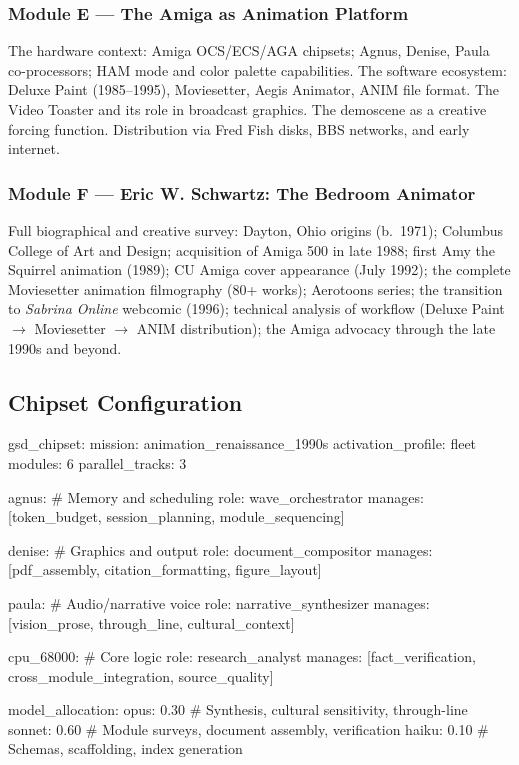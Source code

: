 \documentclass[11pt,letterpaper]{article}
\begin{document}
\subsubsection{Module E --- The Amiga as Animation Platform}
The hardware context: Amiga OCS/ECS/AGA chipsets; Agnus, Denise, Paula co-processors; HAM mode and color palette capabilities. The software ecosystem: Deluxe Paint (1985–1995), Moviesetter, Aegis Animator, ANIM file format. The Video Toaster and its role in broadcast graphics. The demoscene as a creative forcing function. Distribution via Fred Fish disks, BBS networks, and early internet.

\subsubsection{Module F --- Eric W. Schwartz: The Bedroom Animator}
Full biographical and creative survey: Dayton, Ohio origins (b.\ 1971); Columbus College of Art and Design; acquisition of Amiga 500 in late 1988; first Amy the Squirrel animation (1989); CU Amiga cover appearance (July 1992); the complete Moviesetter animation filmography (80+ works); Aerotoons series; the transition to \textit{Sabrina Online} webcomic (1996); technical analysis of workflow (Deluxe Paint $\rightarrow$ Moviesetter $\rightarrow$ ANIM distribution); the Amiga advocacy through the late 1990s and beyond.

\subsection{Chipset Configuration}

\begin{asciibox}
gsd_chipset:
  mission: animation_renaissance_1990s
  activation_profile: fleet
  modules: 6
  parallel_tracks: 3

  agnus:          # Memory and scheduling
    role: wave_orchestrator
    manages: [token_budget, session_planning, module_sequencing]

  denise:         # Graphics and output
    role: document_compositor
    manages: [pdf_assembly, citation_formatting, figure_layout]

  paula:          # Audio/narrative voice
    role: narrative_synthesizer
    manages: [vision_prose, through_line, cultural_context]

  cpu_68000:      # Core logic
    role: research_analyst
    manages: [fact_verification, cross_module_integration, source_quality]

  model_allocation:
    opus:    0.30   # Synthesis, cultural sensitivity, through-line
    sonnet:  0.60   # Module surveys, document assembly, verification
    haiku:   0.10   # Schemas, scaffolding, index generation
\end{asciibox}
\end{document}
